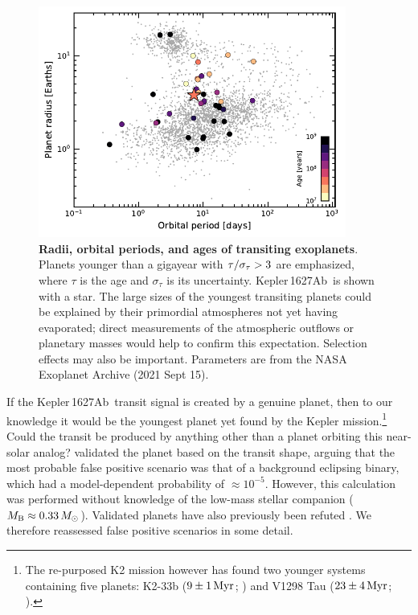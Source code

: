 \documentclass[12pt,modern,twocolumn,tighten,linenumbers]{aastex63}
\newcommand{\pn}{Kepler\,1627Ab} %
\begin{document}
\begin{figure}[!t]
	\begin{center}
		\leavevmode
		\includegraphics[width=0.9\textwidth]{f8.pdf}
	\end{center}
	\vspace{-0.7cm}
	\caption{
		{\bf Radii, orbital periods, and ages of transiting exoplanets}.
		Planets younger than a gigayear with ${\rm \tau}/\sigma_{\tau} >
		3$ are emphasized, where $\tau$ is the age and $\sigma_{\tau}$ is
		its uncertainty.  \pn\ is shown with a star.  The large sizes of
		the youngest transiting planets could be explained by their
		primordial atmospheres not yet having evaporated; direct
		measurements of the atmospheric outflows or planetary masses would
		help to confirm this expectation.  Selection effects may also be
		important.  Parameters are from the NASA Exoplanet Archive (2021
		Sept 15).
		\label{fig:rp_period_age}
	}
\end{figure}

If the \pn\ transit signal is created by a genuine planet,  then to
our knowledge it would be the youngest planet yet found by the
Kepler mission.\footnote{The re-purposed K2 mission however has found
two younger systems containing five planets: K2-33b ($9\pm1\,{\rm
Myr}$; \citealt{Mann_K2_33b_2016,David_et_al_2017}) and V1298 Tau
($23\pm4\,{\rm Myr}$; \citealt{david_four_2019}).}   Could the transit
be produced by anything other than a planet orbiting this near-solar
analog?  \citet{morton_false_2016} validated the planet based on the
transit shape, arguing that the most probable false positive scenario
was that of a background eclipsing binary, which had a model-dependent
probability of $\approx$$10^{-5}$.  However, this calculation was
performed without knowledge of the low-mass stellar companion ($M_{\rm
B}\approx 0.33\,M_\odot$).  Validated planets have also previously
been refuted \citep[{\it e.g.},][]{shporer_three_2017}.  We therefore
reassessed false positive scenarios in some detail. 
\end{document}
